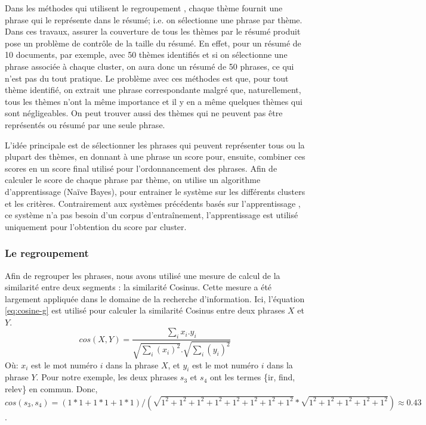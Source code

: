 \documentclass[a4paper,12pt,oneside]{../use/ESIthesis}
\begin{document}
Dans les méthodes qui utilisent le regroupement \cite{01-nomoto-al,02-hardy-al,11-song-al}, chaque thème fournit une phrase qui le représente dans le résumé; i.e. on sélectionne une phrase par thème. 
Dans ces travaux, assurer la couverture de tous les thèmes par le résumé produit pose un problème de contrôle de la taille du résumé. 
En effet, pour un résumé de 10 documents, par exemple, avec 50 thèmes identifiés et si on sélectionne une phrase associée à chaque cluster, on aura donc un résumé de 50 phrases, ce qui n'est pas du tout pratique. 
Le problème avec ces méthodes est que, pour tout thème identifié, on extrait une phrase correspondante malgré que, naturellement, tous les thèmes n'ont la même importance et il y en a même quelques thèmes qui sont négligeables. 
On peut trouver aussi des thèmes qui ne peuvent pas être représentés ou résumé par une seule phrase. 

L'idée principale est de sélectionner les phrases qui peuvent représenter tous ou la plupart des thèmes, en donnant à une phrase un score pour, ensuite, combiner ces scores en un score final utilisé pour l'ordonnancement des phrases.
Afin de calculer le score de chaque phrase par thème, on utilise un algorithme d'apprentissage (Naïve Bayes), pour entrainer le système sur les différents clusters et les critères. 
Contrairement aux systèmes précédents basés sur l'apprentissage \cite{95-kupiec-al,01-amini-gallinari,02-osborne,05-yeh-al,10-yatsko-al}, ce système n'a pas besoin d'un corpus d'entraînement, l'apprentissage est utilisé uniquement pour l'obtention du score par cluster. 

\subsubsection{Le regroupement}

Afin de regrouper les phrases, nous avons utilisé une mesure de calcul de la similarité entre deux segments : la similarité Cosinus. Cette mesure a été largement appliquée dans le domaine de la recherche d'information.
Ici, l'équation \ref{eq:cosine-g} est utilisé pour calculer la similarité Cosinus entre deux phrases $ X $ et $ Y $.
\begin{equation}
\label{eq:cosine-g}
cos(X,Y) = \frac {\sum_i {x_i.y_i} }
{\sqrt{\sum_i(x_i)^2} . \sqrt{\sum_i(y_i)^2}}
\end{equation}
Où: $ x_i $ est le mot numéro $ i $ dans la phrase $ X $, et $ y_i $ est le mot numéro $ i $ dans la phrase $ Y $.
Pour notre exemple, les deux phrases $ s_3 $ et $ s_4 $ ont les termes \{ir, find, relev\} en commun. 
Donc, $ cos(s_3,s_4)= (1*1 + 1*1 + 1*1) /(\sqrt{1^2+1^2+1^2+1^2+1^2+1^2+1^2+1^2}*\sqrt{1^2+1^2+1^2+1^2+1^2})\approx 0.43$.
\end{document}
